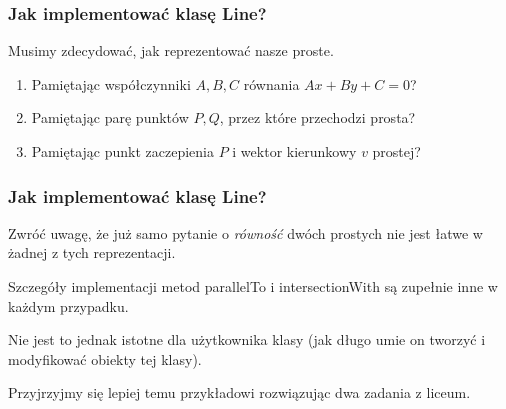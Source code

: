 \documentclass[pdftex, smaller]{beamer}
\begin{document}
\begin{frame}
\frametitle{Jak implementować klasę Line?}

Musimy zdecydować, jak reprezentować nasze proste.
\vspace{6mm}

\begin{enumerate}
\item Pamiętając współczynniki $A, B, C$ równania $Ax + By + C = 0$?

\vspace{4mm}
\item Pamiętając parę punktów $P, Q$, przez które przechodzi prosta?

\vspace{4mm}
\item Pamiętając punkt zaczepienia $P$ i wektor kierunkowy $v$ prostej?
\end{enumerate}

\end{frame}

\begin{frame}
\frametitle{Jak implementować klasę Line?}

Zwróć uwagę, że już samo pytanie o \emph{równość} dwóch prostych nie jest łatwe w żadnej z tych reprezentacji.

\vspace{4mm}
Szczegóły implementacji metod parallelTo i intersectionWith są zupełnie inne w każdym przypadku.

\vspace{4mm}
Nie jest to jednak istotne dla użytkownika klasy (jak długo umie on tworzyć i modyfikować obiekty tej klasy).

\vspace{4mm}
Przyjrzyjmy się lepiej temu przykładowi rozwiązując dwa zadania z liceum.
\end{frame}
\end{document}
